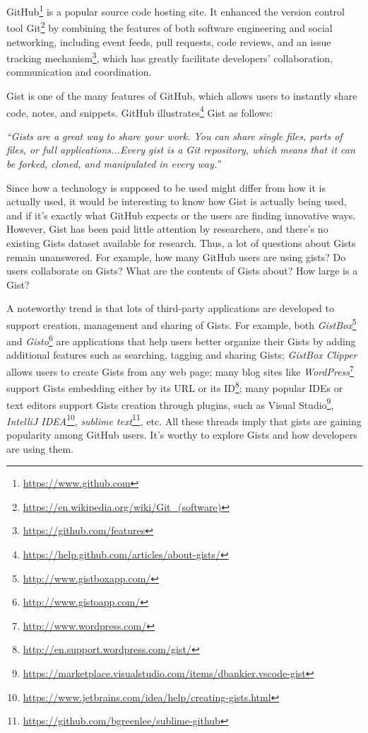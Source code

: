 
GitHub\footnote{\url{https://www.github.com}} is a popular source code hosting site. It enhanced the version control tool Git\footnote{\url{https://en.wikipedia.org/wiki/Git_(software)}} by combining the features of both software engineering and social networking, including event feeds, pull requests, code reviews,
and an issue tracking mechanism\footnote{\url{https://github.com/features}}, which has greatly facilitate developers' collaboration, communication and coordination.  

Gist is one of the many features of GitHub, which allows users to instantly share code, notes, and snippets. GitHub illustrates\footnote{\url{https://help.github.com/articles/about-gists/}} Gist as follows:

\textsl{``Gists are a great way to share your work. You can share single files, parts of files, or full applications...Every gist is a Git repository, which means that it can be forked, cloned, and manipulated in every way.''}

Since how a technology is supposed to be used might differ from how it is actually used, it would be interesting to know how Gist is actually being used, and if it's exactly what GitHub expects or the users are finding innovative ways. However, Gist has been paid little attention by researchers, and there's no existing Gists dataset available for research. Thus, a lot of questions about Gists remain unanswered. For example, how many GitHub users are using gists? Do users collaborate on Gists? What are the contents of Gists about? How large is a Gist? 

A noteworthy trend is that lots of third-party applications are developed to support creation, management and sharing of Gists. For example, both \textit{GistBox}\footnote{\url{http://www.gistboxapp.com/}} and \textit{Gisto}\footnote{\url{http://www.gistoapp.com/}} are applications that help users better organize their Gists by adding additional features such as searching, tagging and sharing Gists; \textit{GistBox Clipper} allows users to create Gists from any web page; many blog sites like \textit{WordPress}\footnote{\url{http://www.wordpress.com/}} support Gists embedding either by its URL or its ID\footnote{\url{http://en.support.wordpress.com/gist/}}; many popular IDEs or text editors support Gists creation through plugins, such as Visual Studio\footnote{\url{https://marketplace.visualstudio.com/items/dbankier.vscode-gist}}, \textit{IntelliJ IDEA}\footnote{\url{https://www.jetbrains.com/idea/help/creating-gists.html}}, \textit{sublime text}\footnote{\url{https://github.com/bgreenlee/sublime-github}}, etc. All these threads imply that gists are gaining popularity among GitHub users. It's worthy to explore Gists and how developers are using them.

